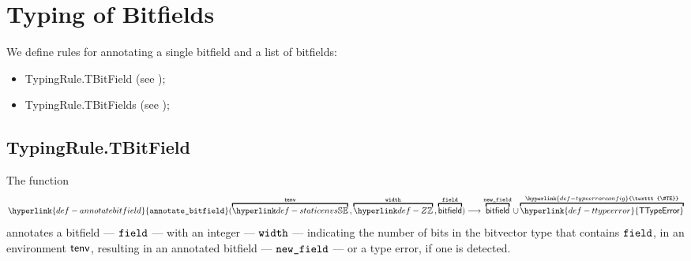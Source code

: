 \documentclass{book}
\newcommand\TTypeError[0]{\hyperlink{def-ttypeerror}{\textsf{TTypeError}}}
\newcommand\TypeErrorConfig[0]{\hyperlink{def-typeerrorconfig}{\texttt{\#TE}}}
\newcommand\annotatebitfield[0]{\hyperlink{def-annotatebitfield}{\texttt{annotate\_bitfield}}}
\begin{document}
\chapter{Typing of Bitfields}

We define rules for annotating a single bitfield and a list of bitfields:
\begin{itemize}
  \item TypingRule.TBitField (see );
  \item TypingRule.TBitFields (see );
\end{itemize}

\section{TypingRule.TBitField \label{sec:TypingRule.TBitField}}
\hypertarget{def-annotatebitfield}{}
The function
\[
  \annotatebitfield(\overname{\staticenvs}{\tenv} \aslsep \overname{\Z}{\width} \aslsep \overname{\bitfield}{\field})
  \aslto \overname{\bitfield}{\newfield} \cup \overname{\TTypeError}{\TypeErrorConfig}
\]
annotates a bitfield --- $\texttt{field}$ --- with an integer --- $\texttt{width}$ --- indicating the number of bits in
the bitvector type that contains $\texttt{field}$,
in an environment $\textsf{tenv}$, resulting in an
annotated bitfield --- $\texttt{new\_field}$ --- or a type error, if one is detected.
\end{document}
